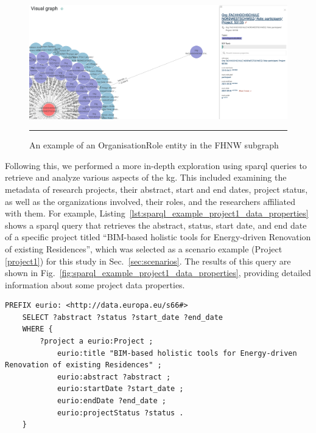 \begin{figure}[htbp]
    \centering
 \includegraphics[width=.9\textwidth]{figures/architecture/graphdb-fhnw-organisationRole-example.png}
     \rule{35em}{0.5pt}
    \caption{An example of an OrganisationRole entity in the FHNW subgraph}
 \label{fig:fhnw-organisationRole-example}
\end{figure}

Following this, we performed a more in-depth exploration using \gls{sparql} queries to retrieve and analyze various aspects of the \gls{kg}.
This included examining the metadata of research projects, their abstract, start and end dates, project status, as well as the organizations involved, their roles, and the researchers affiliated with them.
For example, Listing~\ref{lst:sparql_example_project1_data_properties} shows a \gls{sparql} query that retrieves the abstract, status, start date, and end date of a specific project titled ``BIM-based holistic tools for Energy-driven Renovation of existing Residences'', which was selected as a scenario example (Project \ref{project1}) for this study in Sec.~\ref{sec:scenarios}.
The results of this query are shown in Fig.~\ref{fig:sparql_example_project1_data_properties}, providing detailed information about some project data properties.

\begin{lstlisting}[language=SPARQL, caption={\gls{sparql} query for getting the abstract, status, start date, and end date of a project titled ``BIM-based holistic tools for Energy-driven Renovation of existing Residences''}, label=lst:sparql_example_project1_data_properties]
    PREFIX eurio: <http://data.europa.eu/s66#>
    SELECT ?abstract ?status ?start_date ?end_date
    WHERE {
        ?project a eurio:Project ; 
            eurio:title "BIM-based holistic tools for Energy-driven Renovation of existing Residences" ;
            eurio:abstract ?abstract ;
            eurio:startDate ?start_date ;
            eurio:endDate ?end_date ;
            eurio:projectStatus ?status .
    }
\end{lstlisting}

